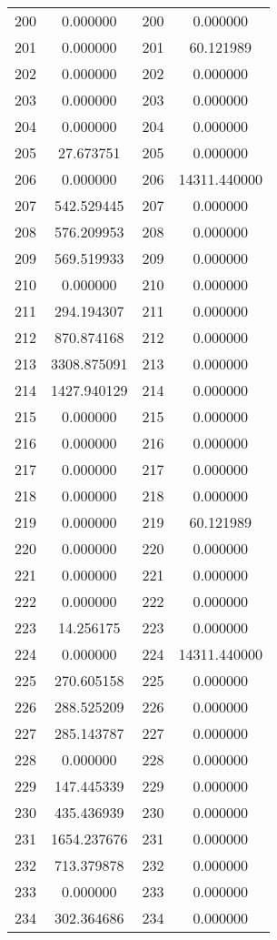 \documentclass[12pt]{article}
\begin{document}
\begin{longtable}{@{}cccc@{}}
200 & 0.000000 & 200 & 0.000000 \\
201 & 0.000000 & 201 & 60.121989 \\
202 & 0.000000 & 202 & 0.000000 \\
203 & 0.000000 & 203 & 0.000000 \\
204 & 0.000000 & 204 & 0.000000 \\
205 & 27.673751 & 205 & 0.000000 \\
206 & 0.000000 & 206 & 14311.440000 \\
207 & 542.529445 & 207 & 0.000000 \\
208 & 576.209953 & 208 & 0.000000 \\
209 & 569.519933 & 209 & 0.000000 \\
210 & 0.000000 & 210 & 0.000000 \\
211 & 294.194307 & 211 & 0.000000 \\
212 & 870.874168 & 212 & 0.000000 \\
213 & 3308.875091 & 213 & 0.000000 \\
214 & 1427.940129 & 214 & 0.000000 \\
215 & 0.000000 & 215 & 0.000000 \\
216 & 0.000000 & 216 & 0.000000 \\
217 & 0.000000 & 217 & 0.000000 \\
218 & 0.000000 & 218 & 0.000000 \\
219 & 0.000000 & 219 & 60.121989 \\
220 & 0.000000 & 220 & 0.000000 \\
221 & 0.000000 & 221 & 0.000000 \\
222 & 0.000000 & 222 & 0.000000 \\
223 & 14.256175 & 223 & 0.000000 \\
224 & 0.000000 & 224 & 14311.440000 \\
225 & 270.605158 & 225 & 0.000000 \\
226 & 288.525209 & 226 & 0.000000 \\
227 & 285.143787 & 227 & 0.000000 \\
228 & 0.000000 & 228 & 0.000000 \\
229 & 147.445339 & 229 & 0.000000 \\
230 & 435.436939 & 230 & 0.000000 \\
231 & 1654.237676 & 231 & 0.000000 \\
232 & 713.379878 & 232 & 0.000000 \\
233 & 0.000000 & 233 & 0.000000 \\
234 & 302.364686 & 234 & 0.000000 \\

\end{longtable}
\end{document}
